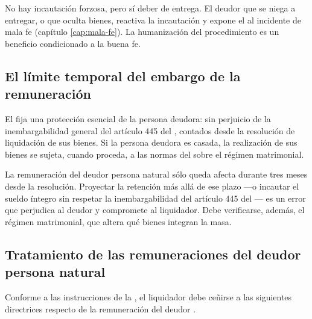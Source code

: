 \begin{foco}
No hay incautación forzosa, pero sí deber de entrega. El deudor que se niega a entregar, o que
oculta bienes, reactiva la incautación y expone el \discharge{} al incidente de mala fe
(capítulo \ref{cap:mala-fe}). La humanización del procedimiento es un beneficio condicionado a
la buena fe.
\end{foco}

\subsection{El límite temporal del embargo de la remuneración}

El  fija una protección esencial de la persona deudora: sin perjuicio de la
inembargabilidad general del artículo 445  del \cpc{},  contados desde la resolución de
liquidación de sus bienes. Si la persona deudora es casada, la realización de sus bienes se
sujeta, cuando proceda, a las normas del \cc{} sobre el régimen matrimonial.

\begin{alerta}
La remuneración del deudor persona natural sólo queda afecta durante tres meses desde la
resolución. Proyectar la retención más allá de ese plazo ---o incautar el sueldo íntegro sin
respetar la inembargabilidad del artículo 445 del \cpc{}--- es un error que perjudica al deudor y
compromete al liquidador. Debe verificarse, además, el régimen matrimonial, que altera qué
bienes integran la masa.
\end{alerta}

\bloquePractico

\subsection{Tratamiento de las remuneraciones del deudor persona natural}

Conforme a las instrucciones de la \superir{}, el liquidador debe ceñirse a las
siguientes directrices respecto de la remuneración del deudor
\parencite{instructivo-i5}.

